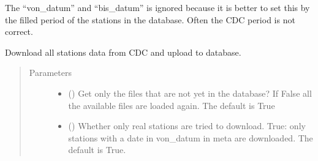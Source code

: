 \documentclass[letterpaper,10pt,english]{sphinxmanual}
\begin{document}
\begin{fulllineitems}
\begin{fulllineitems}
\sphinxAtStartPar
The “von\_datum” and “bis\_datum” is ignored because it is better to set this by the filled period of the stations in the database.
Often the CDC period is not correct.

\end{fulllineitems}


\begin{fulllineitems}
\label{\detokenize{weatherDB:weatherDB.stations.StationsBase.update_period_meta}}
\end{fulllineitems}


\begin{fulllineitems}
\label{\detokenize{weatherDB:weatherDB.stations.StationsBase.update_raw}}
\sphinxAtStartPar
Download all stations data from CDC and upload to database.
\begin{quote}\begin{description}
\item[{Parameters}] \leavevmode\begin{itemize}
\item {} 
\sphinxAtStartPar
{} (\sphinxstyleliteralemphasis{\sphinxupquote{, }}) \textendash{} Get only the files that are not yet in the database?
If False all the available files are loaded again.
The default is True

\item {} 
\sphinxAtStartPar
{} (\sphinxstyleliteralemphasis{\sphinxupquote{, }}) \textendash{} Whether only real stations are tried to download.
True: only stations with a date in von\_datum in meta are downloaded.
The default is True.

\end{itemize}

\end{description}\end{quote}

\end{fulllineitems}


\end{fulllineitems}
\end{document}
